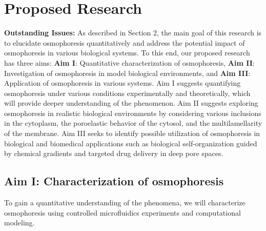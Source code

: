 \documentclass[11pt]{article}
\begin{document}
\section{Proposed Research\label{sec:ProposedResearch}}
\noindent
{\bf Outstanding Issues:}
%
As described in Section 2, the main goal of this research is to
elucidate osmophoresis quantitatively and address the potential impact
of osmophoresis in various biological systems. To this end, our proposed
research has three aims: {\bf Aim I}: Quantitative characterization of
osmophoresis, {\bf Aim II}: Investigation of osmophoresis in model
biological environments, and {\bf Aim III}: Application of osmophoresis
in various systems. Aim I suggests quantifying osmophoresis under
various conditions experimentally and theoretically, which will provide
deeper understanding of the phenomenon. Aim II suggests exploring
osmophoresis in realistic biological environments by considering various
inclusions in the cytoplasm, the poroelastic behavior of the cytosol,
and the multilamellarity of the membrane. Aim III seeks to identify
possible utilization of osmophoresis in biological and biomedical
applications such as biological self-organization guided by chemical
gradients and targeted drug delivery in deep pore spaces.

\subsection{Aim I: Characterization of osmophoresis}
\label{subsec:aim1}
To gain a quantitative understanding of the phenomena, we will
characterize osmophoresis using controlled microfluidics experiments and
computational modeling.

\end{document}
